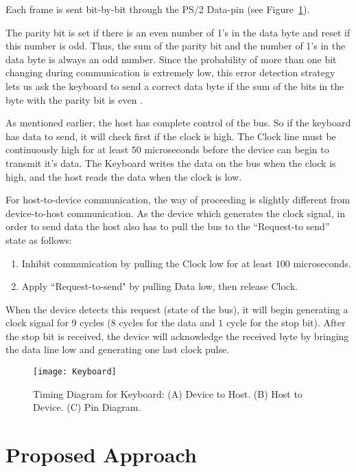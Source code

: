 \documentclass[conference]{IEEEtran}
\begin{document}
Each frame is sent bit-by-bit through the PS/2 Data-pin (see Figure~\ref{keyboard}).

The parity bit is set if there is an even number of 1’s in the data byte and reset if this number is odd. Thus, the sum of the parity bit and the number of 1’s in the data byte is always an odd number. Since the probability of more than one bit changing during communication is extremely low, this error detection strategy lets us ask the keyboard to send a correct data byte if the sum of the bits in the byte with the parity bit is even \cite{Chapweske:2003}.

As mentioned earlier, the host has complete control of the bus. So if the keyboard has data to send, it will check first if the clock is high.  The Clock line must be continuously high for at least $50$ microseconds before the device can begin to transmit it's data. The Keyboard writes the data on the bus when the clock is high, and the host reads the data when the clock is low.

For host-to-device communication, the way of proceeding is slightly different from device-to-host communication. As the device which generates the clock signal, in order to send data the host also has to pull the bus to the ``Request-to send” state as follows:

\begin{enumerate}
\item Inhibit communication by pulling the Clock low for at least $100$ microseconds.
\item Apply ``Request-to-send" by pulling Data low, then release Clock.
\end{enumerate}

When the device detects this request (state of the bus), it will begin generating a clock signal for $9$ cycles ($8$ cycles for the data and $1$ cycle for the stop bit). After the stop bit is received, the device will acknowledge the received byte by bringing the data line low and generating one last clock pulse\cite{Howie:2009}.

\begin{figure*}[!t]
\centering
\texttt{[image: Keyboard]}
\caption{Timing Diagram for Keyboard: (A) Device to Host. (B) Host to Device. (C) Pin Diagram.}
\label{keyboard}
\end{figure*}

\section{Proposed Approach}
\end{document}
